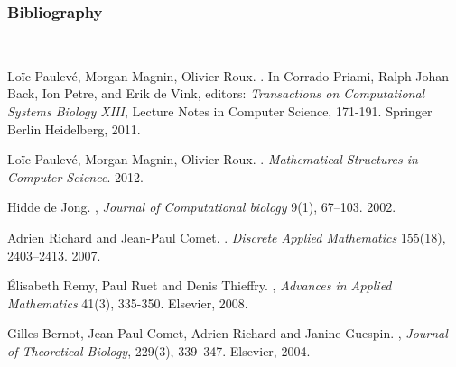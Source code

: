 
\begin{frame}[c]
  \frametitle{Bibliography}

\footnotesize
\setlength{\parindent}{-1em}
\setlength{\parskip}{0.5em}
~

\vfill

\tcitebullet Loïc Paulevé, Morgan Magnin, Olivier Roux. . In Corrado Priami, Ralph-Johan Back, Ion Petre, and Erik de Vink, editors: \textit{Transactions on Computational Systems Biology XIII}, Lecture Notes in Computer Science, 171-191. Springer Berlin Heidelberg, 2011.

\tcitebullet Loïc Paulevé, Morgan Magnin, Olivier Roux. . \textit{Mathematical Structures in Computer Science}. 2012.



\tcitebullet Hidde de Jong. , \textit{Journal of Computational biology} 9(1), 67--103. 2002.

\tcitebullet Adrien Richard and Jean-Paul Comet. . \textit{Discrete Applied Mathematics} 155(18), 2403--2413. 2007.

\tcitebullet Élisabeth Remy, Paul Ruet and Denis Thieffry. , \textit{Advances in Applied Mathematics} 41(3), 335-350. Elsevier, 2008.

\tcitebullet Gilles Bernot, Jean-Paul Comet, Adrien Richard and Janine Guespin. , \textit{Journal of Theoretical Biology}, 229(3), 339--347. Elsevier, 2004.


\end{frame}
